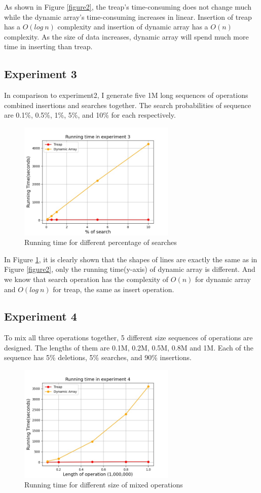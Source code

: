 \documentclass[11pt]{article}
\begin{document}
As shown in Figure \ref{figure2}, the treap's time-consuming does not change much while the dynamic array's time-consuming increases in linear.
Insertion of treap has a $O(log\ n)$ complexity and insertion of dynamic array has a $O(n)$ complexity.
As the size of data increases, dynamic array will spend much more time in inserting than treap.

\subsection{Experiment 3}
In comparison to experiment2, I generate five 1M long sequences of operations combined insertions and searches together.
The search probabilities of sequence are 0.1\%, 0.5\%, 1\%, 5\%, and 10\% for each respectively.
  
\begin{figure}
\centering
\includegraphics[width=7.5cm]{exp3.jpg} %
\caption{Running time for different percentage of searches}\label{figure3} %
\end{figure}
In Figure \ref{figure3}, it is clearly shown that the shapes of lines are exactly the same as in Figure \ref{figure2}, only the running time(y-axis) of dynamic array is different.
And we know that search operation has the complexity of $O(n)$ for dynamic array and $O(log\ n)$ for treap, the same as insert operation.

\subsection{Experiment 4}
To mix all three operations together, 5 different size sequences of operations are designed. 
The lengths of them are 0.1M, 0.2M, 0.5M, 0.8M and 1M.
Each of the sequence has 5\% deletions, 5\% searches, and 90\% insertions. 

\begin{figure}
\centering
\includegraphics[width=7.5cm]{exp4.jpg} %
\caption{Running time for different size of mixed operations}\label{figure4} %
\end{figure}
\end{document}
